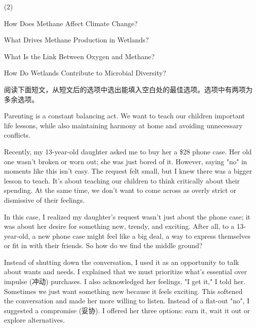 \documentclass{英语试卷}
\begin{document}
\begin{choices}(2)
  \item How Does Methane Affect Climate Change?
  \item What Drives Methane Production in Wetlands?
  \item What Is the Link Between Oxygen and Methane?
  \item How Do Wetlands Contribute to Microbial Diversity?
\end{choices}
\par 阅读下面短文，从短文后的选项中选出能填入空白处的最佳选项。选项中有两项为多余选项。\par
\par Parenting is a constant balancing act. We want to teach our children important life lessons, while also maintaining harmony at home and avoiding unnecessary conflicts. \par
\par Recently, my 13-year-old daughter asked me to buy her a \$28 phone case. Her old one wasn't broken or worn out; she was just bored of it.  However, saying "no" in moments like this isn't easy. The request felt small, but I knew there was a bigger lesson to teach. It's about teaching our children to think critically about their spending. At the same time, we don't want to come across as overly strict or dismissive of their feelings.\par
\par In this case, I realized my daughter's request wasn't just about the phone case; it was about her desire for something new, trendy, and exciting.  After all, to a 13-year-old, a new phone case might feel like a big deal, a way to express themselves or fit in with their friends. So how do we find the middle ground?\par
\par Instead of shutting down the conversation, I used it as an opportunity to talk about wants and needs. I explained that we must prioritize what's essential over impulse (冲动) purchases.  I also acknowledged her feelings. "I get it," I told her. Sometimes we just want something new because it feels exciting. This softened the conversation and made her more willing to listen. Instead of a flat-out "no", I suggested a compromise (妥协). I offered her three options: earn it, wait it out or explore alternatives.\par
\end{document}
